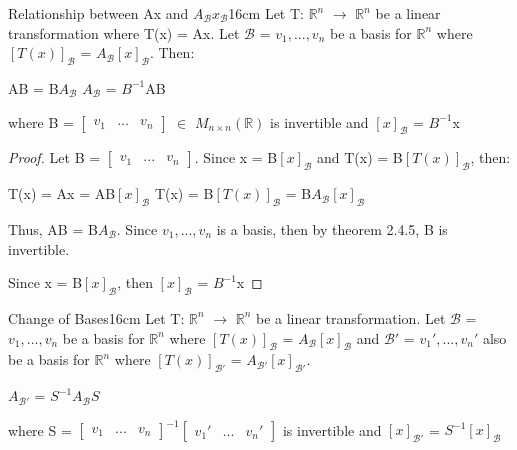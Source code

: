     \begin{wtheorem}{Relationship between Ax and
    $A_{\mathcal{B}}x_{\mathcal{B}}$}{16cm}
        Let T: $\mathbb{R}^n$ $\rightarrow$ $\mathbb{R}^n$
        be a linear transformation where T(x) = Ax.
        Let $\mathcal{B}$ = $v_1,...,v_n$ be a basis for $\mathbb{R}^n$
        where $[T(x)]_{\mathcal{B}}$ = $A_{\mathcal{B}}[x]_{\mathcal{B}}$.
        Then:

        \hspace{0.5cm}
        AB = B$A_{\mathcal{B}}$
        \hspace{1cm}
        $A_{\mathcal{B}}$ = $B^{-1}$AB

        where B =
        $\begin{bmatrix}
            v_1 & ... & v_n
        \end{bmatrix}$ $\in$ $M_{n \times n}(\mathbb{R})$
        is invertible
        and $[x]_{\mathcal{B}}$ = $B^{-1}$x
    \end{wtheorem}

    \begin{proof}
        Let B =
        $\begin{bmatrix}
            v_1 & ... & v_n
        \end{bmatrix}$.
        Since x = B$[x]_{\mathcal{B}}$ and T(x) = B$[T(x)]_{\mathcal{B}}$, then:

        \hspace{0.5cm}
        T(x) = Ax
        = AB$[x]_{\mathcal{B}}$
        \hspace{1cm}
        T(x) = B$[T(x)]_{\mathcal{B}}$
        = B$A_{\mathcal{B}}[x]_{\mathcal{B}}$

        Thus, AB = B$A_{\mathcal{B}}$.
        Since $v_1,...,v_n$ is a basis, then
        by {\color{red} theorem 2.4.5}, B is invertible.

        Since x = B$[x]_{\mathcal{B}}$, then $[x]_{\mathcal{B}}$ = $B^{-1}$x
    \end{proof}

    \newpage



    \begin{corollary}{Change of Bases}{16cm}
        Let T: $\mathbb{R}^n$ $\rightarrow$ $\mathbb{R}^n$
        be a linear transformation.
        Let $\mathcal{B}$ = $v_1,...,v_n$ be a basis for $\mathbb{R}^n$
        where $[T(x)]_{\mathcal{B}}$ = $A_{\mathcal{B}}[x]_{\mathcal{B}}$
        and $\mathcal{B}'$ = $v_1',...,v_n'$ also be a basis for $\mathbb{R}^n$
        where $[T(x)]_{\mathcal{B}'}$ = $A_{\mathcal{B}'}[x]_{\mathcal{B}'}$.

        \hspace{0.5cm}
        $A_{\mathcal{B}'}$
        = $S^{-1} A_{\mathcal{B}}S$

        where S =
        $\begin{bmatrix}
            v_1 & ... & v_n
        \end{bmatrix}^{-1}
        \begin{bmatrix}
            v_1' & ... & v_n'
        \end{bmatrix}$
        is invertible
        and $[x]_{\mathcal{B}'}$ = $S^{-1}[x]_{\mathcal{B}}$ 
    \end{corollary}

